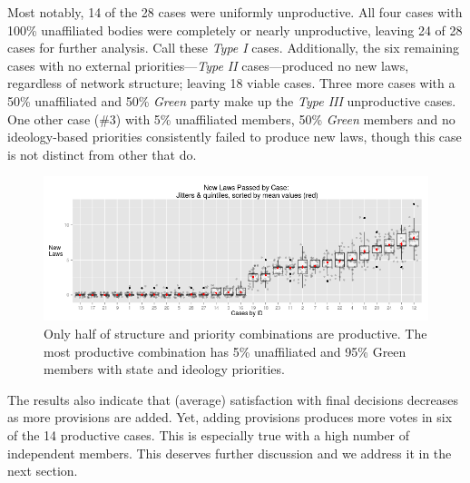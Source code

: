\documentclass[pdftex,12pt]{llncs}
\begin{document}
Most notably, 14 of the 28 cases were uniformly unproductive.
All four cases with 100\% unaffiliated bodies were completely or nearly unproductive, leaving 24 of 28 cases for further analysis.
Call these \textit{Type I} cases.
Additionally, the six remaining cases with no external priorities---\textit{Type II} cases---produced no new laws, regardless of network structure; leaving 18 viable cases.
Three more cases with a 50\% unaffiliated and 50\% \textit{Green} party make up the \textit{Type III} unproductive cases.
One other case (\#3) with 5\% unaffiliated members, 50\% \textit{Green} members and no ideology-based priorities consistently failed to produce new laws, though this case is not distinct from other that do. 

\begin{figure}[h]
\centering
\includegraphics[width=4.9in]{laws_byJob_jitterQuints.png}
\caption[ ]{Only half of structure and priority combinations are productive. The most productive combination has 5\% unaffiliated and 95\% Green members with state and ideology priorities.} 
\label{lawspassed}
\end{figure}
 
  
The results also indicate that (average) satisfaction with final decisions decreases as more provisions are added.
Yet, adding provisions produces more votes in six of the 14 productive cases. 
This is especially true with a high number of independent members.  
This deserves further discussion and we address it in the next section.

\end{document}
